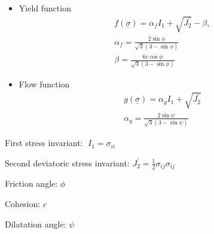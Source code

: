 \documentclass[pdftex,cig,slideColor]{pp4slides}
\begin{document}
  \vfill
  \begin{itemize}
  \item Yield function
    \vspace*{-14pt}
    \begin{gather}
      f (\underline{\sigma}) = \alpha_{f} I_{1} + \sqrt{J_{2}^{\prime}}-\beta, \\
      \alpha_{f } =\frac{2\sin\phi}{\sqrt{3}\left(3-\sin\phi\right)} \\
      \beta=\frac{6c\cos\phi}{\sqrt{3}\left(3-\sin\phi\right)}
    \end{gather}
    \vspace*{-36pt}
  \item Flow function
    \vspace*{-14pt}
    \begin{gather}    
      g\left(\underline{\sigma}\right) = \alpha_{g}I_{1}+\sqrt{J_{2}^{\prime}} \\
      \alpha_{g}=\frac{2\sin\psi}{\sqrt{3}\left(3-\sin\psi\right)}
    \end{gather}
    \vspace*{-36pt}
  \end{itemize}
  \vfill
  {\small
    \begin{description}
    \item First stress invariant: $\; I_{1}=\sigma_{ii}$
    \item Second deviatoric stress invariant:
      $J_{2}^{\prime}=\frac{1}{2}\sigma_{ij}\sigma_{ij}$
    \item Friction angle: $\phi$
    \item Cohesion: $c$
    \item Dilatation angle: $\psi$
    \end{description}
  }

 
\end{document}

